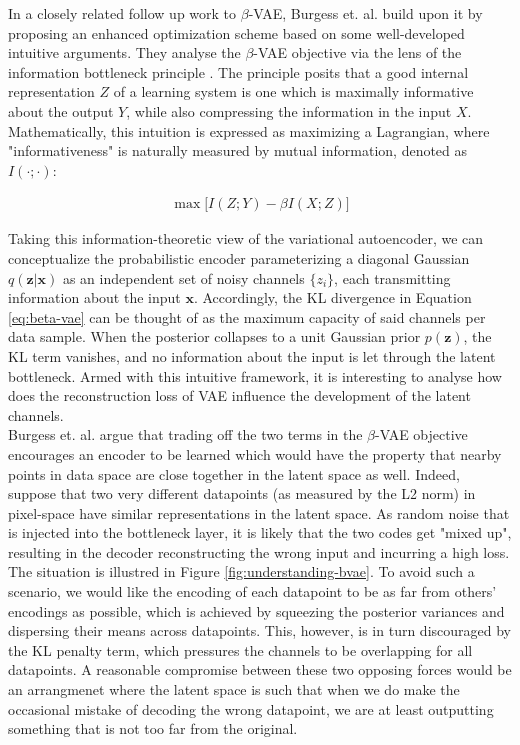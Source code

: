 \documentclass{report}
\begin{document}
\noindent In a closely related follow up work to $\beta$-VAE, Burgess et. al. \cite{understanding-beta-vae} build upon it by proposing an enhanced optimization scheme based on some well-developed intuitive arguments. They analyse the $\beta$-VAE objective via the lens of the information bottleneck principle \cite{tishby-ib}. The principle posits that a good internal representation $Z$ of a learning system is one which is maximally informative about the output $Y$, while also compressing the information in the input $X$. Mathematically, this intuition is expressed as maximizing a Lagrangian, where "informativeness" is naturally measured by mutual information, denoted as $I(\cdot; \cdot)$:

\begin{equation}
\begin{gathered}
\max \big[ I(Z; Y) - \beta I(X;Z) \big]
\end{gathered}
\label{eq:ib}
\end{equation}

\bigskip

\noindent Taking this information-theoretic view of the variational autoencoder, we can conceptualize the probabilistic encoder parameterizing a diagonal Gaussian $q(\boldsymbol{z}|\boldsymbol{x})$ as an independent set of noisy channels $\{z_i\}$, each transmitting information about the input $\boldsymbol{x}$. Accordingly, the KL divergence in Equation \ref{eq:beta-vae} can be thought of as the maximum capacity of said channels per data sample. When the posterior collapses to a unit Gaussian prior $p(\boldsymbol{z})$, the KL term vanishes, and no information about the input is let through the latent bottleneck. Armed with this intuitive framework, it is interesting to analyse how does the reconstruction loss of VAE influence the development of the latent channels. \\

\noindent Burgess et. al. \cite{understanding-beta-vae} argue that trading off the two terms in the $\beta$-VAE objective encourages an encoder to be learned which would have the property that nearby points in data space are close together in the latent space as well. Indeed, suppose that two very different datapoints (as measured by the L2 norm) in pixel-space have similar representations in the latent space. As random noise that is injected into the bottleneck layer, it is likely that the two codes get "mixed up", resulting in the decoder reconstructing the wrong input and incurring a high loss. The situation is illustred in Figure \ref{fig:understanding-bvae}. To avoid such a scenario, we would like the encoding of each datapoint to be as far from others' encodings as possible, which is achieved by squeezing the posterior variances and dispersing their means across datapoints. This, however, is in turn discouraged by the KL penalty term, which pressures the channels to be overlapping for all datapoints. A reasonable compromise between these two opposing forces would be an arrangmenet where the latent space is such that when we do make the occasional mistake of decoding the wrong datapoint, we are at least outputting something that is not too far from the original. \\
\end{document}
